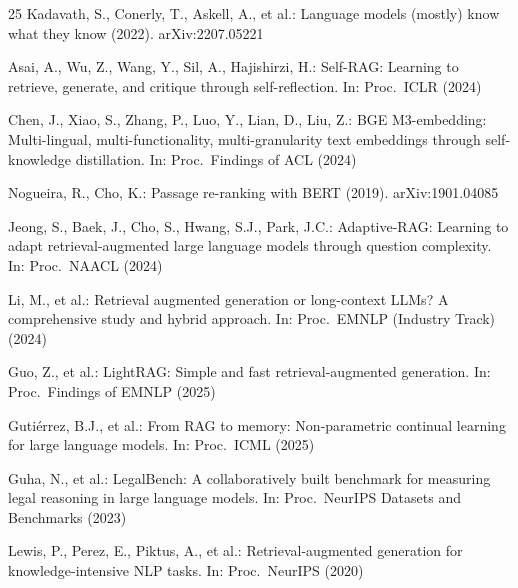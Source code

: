 \documentclass[runningheads]{llncs}
\begin{document}
\begin{thebibliography}{25}
Kadavath, S., Conerly, T., Askell, A., et al.: Language models (mostly) know
what they know (2022). arXiv:2207.05221

Asai, A., Wu, Z., Wang, Y., Sil, A., Hajishirzi, H.: Self-RAG: Learning to
retrieve, generate, and critique through self-reflection. In: Proc.\ ICLR
(2024)

Chen, J., Xiao, S., Zhang, P., Luo, Y., Lian, D., Liu, Z.: BGE M3-embedding:
Multi-lingual, multi-functionality, multi-granularity text embeddings through
self-knowledge distillation. In: Proc.\ Findings of ACL (2024)

Nogueira, R., Cho, K.: Passage re-ranking with BERT (2019).
arXiv:1901.04085

Jeong, S., Baek, J., Cho, S., Hwang, S.J., Park, J.C.: Adaptive-RAG:
Learning to adapt retrieval-augmented large language models through
question complexity. In: Proc.\ NAACL (2024)

Li, M., et al.: Retrieval augmented generation or long-context LLMs? A
comprehensive study and hybrid approach. In: Proc.\ EMNLP (Industry Track)
(2024)

Guo, Z., et al.: LightRAG: Simple and fast retrieval-augmented generation.
In: Proc.\ Findings of EMNLP (2025)

Guti{\'e}rrez, B.J., et al.: From RAG to memory: Non-parametric continual
learning for large language models. In: Proc.\ ICML (2025)

Guha, N., et al.: LegalBench: A collaboratively built benchmark for
measuring legal reasoning in large language models. In: Proc.\ NeurIPS
Datasets and Benchmarks (2023)

Lewis, P., Perez, E., Piktus, A., et al.: Retrieval-augmented generation for
knowledge-intensive NLP tasks. In: Proc.\ NeurIPS (2020)

\end{thebibliography}
\end{document}
